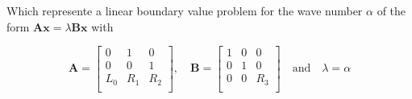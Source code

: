 Which represente a linear boundary value problem for the wave number $\alpha$ of
the form $\mathbf{A}\mathbf{x} = \lambda\mathbf{B}\mathbf{x}$ with 

\begin{equation}
\mathbf{A}=
    \begin{bmatrix}
    0   &1&0\\
    0   &0&1\\
    L_0 &R_1&R_2\\
    \end{bmatrix}
    ,
    \quad
\mathbf{B}=
    \begin{bmatrix}
    1  &0&0\\
    0  &1&0\\
    0  &0&R_3\\
    \end{bmatrix}
    \quad
    \text{and}
    \quad
    \lambda=\alpha
\end{equation}
